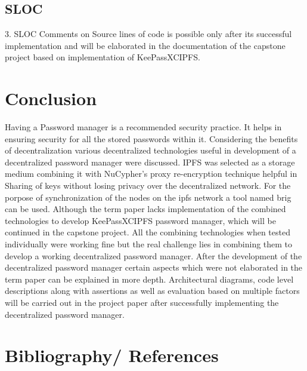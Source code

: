 \documentclass[12pt]{article}
\begin{document}
	

\subsection{SLOC}
        3. SLOC
              Comments on Source lines of code is possible only after its successful implementation and will be elaborated in the documentation of the capstone project based on implementation of KeePassXCIPFS. 
            
		
       
       
\section{Conclusion}
Having a Password manager is a recommended security practice. It helps in ensuring security for all the  stored passwords within it. Considering the benefits of decentralization various decentralized technologies useful in development of a decentralized password manager were discussed. IPFS was selected as a storage medium combining it with NuCypher’s proxy re-encryption technique helpful in Sharing of keys without losing privacy over the decentralized network. For the porpose of synchronization of the nodes on the ipfs network a tool named brig can be used. Although the term paper lacks implementation of the combined technologies to develop KeePassXCIPFS password manager, which will be continued in the capstone project. All the combining technologies when tested individually were working fine but the real challenge lies in combining them to develop a working decentralized password manager. After the development of the decentralized password manager certain aspects which were not elaborated in the term paper can be explained in more depth. Architectural diagrams, code level descriptions along with assertions as well as evaluation based on multiple factors will be carried out in the project paper after successfully implementing the decentralized password manager.   

\newpage

\section{Bibliography/ References}
\end{document}
